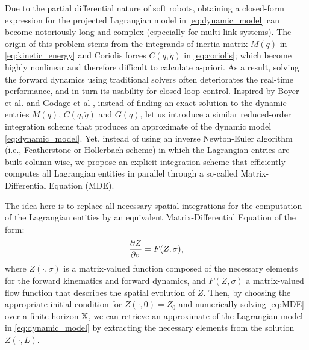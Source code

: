 Due to the partial differential nature of soft robots, obtaining a closed-form expression for the projected Lagrangian model in \eqref{eq:dynamic_model} can become notoriously long and complex (especially for multi-link systems). The origin of this problem stems from the integrands of inertia matrix $M(q)$ in \eqref{eq:kinetic_energy} and Coriolis forces $C(q,\dot{q})$ in \eqref{eq:coriolis}; which become highly nonlinear and therefore difficult to calculate a-priori. As a result, solving the forward dynamics using traditional solvers often deteriorates the real-time performance, and in turn its usability for closed-loop control. Inspired by Boyer et al. \cite{Boyer2021} and Godage et al \cite{Godage2016}, instead of finding an exact solution to the dynamic entries $M(q)$, $C(q,\dot{q})$ and $G(q)$, let us introduce a similar reduced-order integration scheme that produces an approximate of the dynamic model \eqref{eq:dynamic_model}. Yet, instead of using an inverse Newton-Euler algorithm (i.e., Featherstone or Hollerbach scheme) in which the Lagrangian entries are built column-wise, we propose an explicit integration scheme that efficiently computes all Lagrangian entities in parallel through a so-called Matrix-Differential Equation (MDE).

The idea here is to replace all necessary spatial integrations for the computation of the Lagrangian entities by an equivalent Matrix-Differential Equation of the form:
%
\begin{equation}
\frac{\partial Z}{\partial \sigma} = F(Z,\sigma), \label{eq:MDE}
\end{equation}
%
where $Z(\cdot,\sigma)$ is a matrix-valued function composed of the necessary elements for the forward kinematics and forward dynamics, and $F(Z,\sigma)$ a matrix-valued flow function that describes the spatial evolution of $Z$. Then, by choosing the appropriate initial condition for $Z(\cdot,0) = Z_0$ and numerically solving \eqref{eq:MDE} over a finite horizon $\mathbb{X}$, we can retrieve an approximate of the Lagrangian model in \eqref{eq:dynamic_model} by extracting the necessary elements from the solution $Z(\cdot,L)$.

